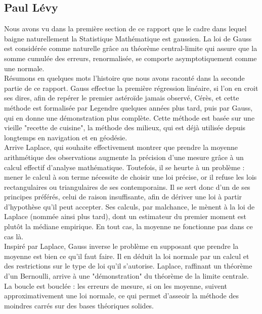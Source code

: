 \documentclass{article}
\begin{document}
\subsection{Paul Lévy}

Nous avons vu dans la première section de ce rapport que le cadre dans lequel baigne naturellement la Statistique Mathématique est gaussien. La loi de Gauss est considérée comme naturelle grâce au théorème central-limite qui assure que la somme cumulée des erreurs, renormalisée, se comporte asymptotiquement comme une normale.\\

Résumons en quelques mots l'histoire que nous avons raconté dans la seconde partie de ce rapport. Gauss effectue la première régression linéaire, si l'on en croit ses dires, afin de repérer le premier astéroïde jamais observé, Cérès, et cette méthode est formalisée par Legendre quelques années plus tard, puis par Gauss, qui en donne une démonstration plus complète. Cette méthode est basée sur une vieille "recette de cuisine", la méthode des milieux, qui est déjà utilisée depuis longtemps en navigation et en géodésie.\\

 Arrive Laplace, qui souhaite effectivement montrer que prendre la moyenne arithmétique des observations augmente la précision d'une mesure grâce à un calcul effectif d'analyse mathématique. Toutefois, il se heurte à un problème : mener le calcul à son terme nécessite de choisir une loi précise, or il refuse les lois rectangulaires ou triangulaires de ses contemporains. Il se sert donc d'un de ses principes préférés, celui de raison insuffisante, afin de dériver une loi à partir d'hypothèse qu'il peut accepter. Ses calculs, par malchance, le mènent à la loi de Laplace (nommée ainsi plus tard), dont un estimateur du premier moment est plutôt la médiane empirique. En tout cas, la moyenne ne fonctionne pas dans ce cas là.\\

 Inspiré par Laplace, Gauss inverse le problème en supposant que prendre la moyenne est bien ce qu'il faut faire. Il en déduit la loi normale par un calcul et des restrictions sur le type de loi qu'il s'autorise. Laplace, raffinant un théorème d'un Bernoulli, arrive à une "démonstration" du théorème de la limite centrale. La boucle est bouclée : les erreurs de mesure, si on les moyenne, suivent approximativement une loi normale, ce qui permet d'asseoir la méthode des moindres carrés sur des bases théoriques solides.\\
\end{document}
